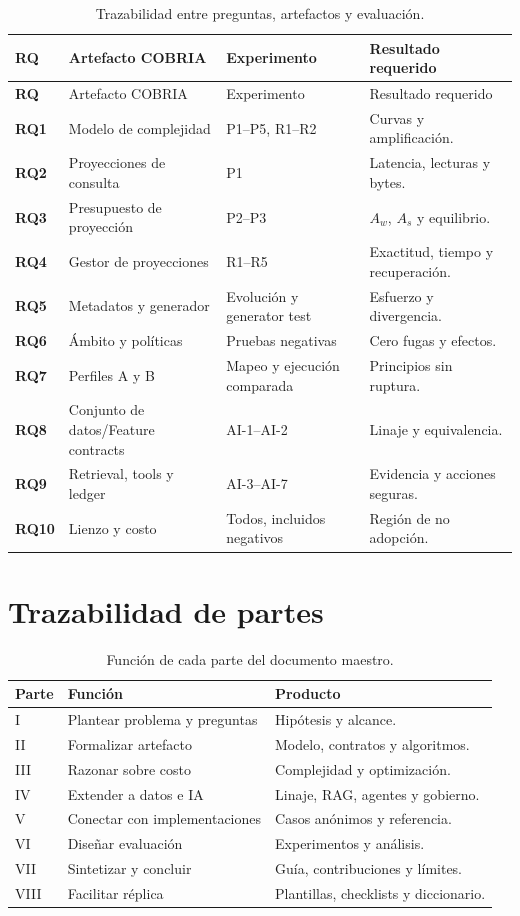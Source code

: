 \begin{longtable}{>{\bfseries}p{1.4cm}p{4.2cm}p{4.6cm}p{3.6cm}}
\caption{Trazabilidad entre preguntas, artefactos y evaluación.}\label{tab:trazabilidad-manuscrito}\\
\toprule
RQ & Artefacto COBRIA & Experimento & Resultado requerido \\
\midrule
\endfirsthead
\toprule
RQ & Artefacto COBRIA & Experimento & Resultado requerido \\
\midrule
\endhead
RQ1 & Modelo de complejidad & P1--P5, R1--R2 & Curvas y amplificación.\\
RQ2 & Proyecciones de consulta & P1 & Latencia, lecturas y bytes.\\
RQ3 & Presupuesto de proyección & P2--P3 & $A_w$, $A_s$ y equilibrio.\\
RQ4 & Gestor de proyecciones & R1--R5 & Exactitud, tiempo y recuperación.\\
RQ5 & Metadatos y generador & Evolución y generator test & Esfuerzo y divergencia.\\
RQ6 & Ámbito y políticas & Pruebas negativas & Cero fugas y efectos.\\
RQ7 & Perfiles A y B & Mapeo y ejecución comparada & Principios sin ruptura.\\
RQ8 & Conjunto de datos/Feature contracts & AI-1--AI-2 & Linaje y equivalencia.\\
RQ9 & Retrieval, tools y ledger & AI-3--AI-7 & Evidencia y acciones seguras.\\
RQ10 & Lienzo y costo & Todos, incluidos negativos & Región de no adopción.\\
\bottomrule
\end{longtable}

\section{Trazabilidad de partes}

\begin{table}[H]
\centering
\caption{Función de cada parte del documento maestro.}
\label{tab:trazabilidad-partes}
\begin{tabularx}{\textwidth}{p{2cm}p{4.3cm}X}
\toprule
Parte & Función & Producto \\
\midrule
I & Plantear problema y preguntas & Hipótesis y alcance.\\
II & Formalizar artefacto & Modelo, contratos y algoritmos.\\
III & Razonar sobre costo & Complejidad y optimización.\\
IV & Extender a datos e IA & Linaje, RAG, agentes y gobierno.\\
V & Conectar con implementaciones & Casos anónimos y referencia.\\
VI & Diseñar evaluación & Experimentos y análisis.\\
VII & Sintetizar y concluir & Guía, contribuciones y límites.\\
VIII & Facilitar réplica & Plantillas, checklists y diccionario.\\
\bottomrule
\end{tabularx}
\end{table}

